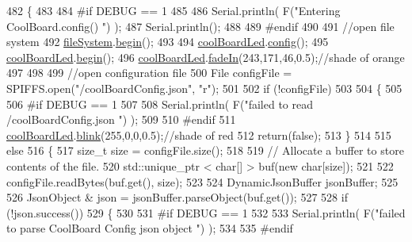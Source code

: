 \begin{DoxyCode}
482 \{
483 
484 \textcolor{preprocessor}{#if DEBUG == 1}
485 
486     Serial.println( F(\textcolor{stringliteral}{"Entering CoolBoard.config() "}) );
487     Serial.println();
488 
489 \textcolor{preprocessor}{#endif}
490 
491     \textcolor{comment}{//open file system}
492     \hyperlink{classCoolBoard_a42c2586fbb13ff7f06538e9284e8538d}{fileSystem}.\hyperlink{classCoolFileSystem_a6ba6f666ed4c530174f8569d2c636748}{begin}();
493 
494     \hyperlink{classCoolBoard_a1b1d3c684a5baa56b08486e192fd8e97}{coolBoardLed}.\hyperlink{classCoolBoardLed_a1b60e5e30bea96c49ed62ed1bf1ffc8b}{config}();
495     \hyperlink{classCoolBoard_a1b1d3c684a5baa56b08486e192fd8e97}{coolBoardLed}.\hyperlink{classCoolBoardLed_ae3cbde8affcc6f011cbd698c8ef911f6}{begin}();
496     \hyperlink{classCoolBoard_a1b1d3c684a5baa56b08486e192fd8e97}{coolBoardLed}.\hyperlink{classCoolBoardLed_ab778f5e7bed0ab74e3906d82110493c3}{fadeIn}(243,171,46,0.5);\textcolor{comment}{//shade of orange     }
497 
498     
499     \textcolor{comment}{//open configuration file}
500     File configFile = SPIFFS.open(\textcolor{stringliteral}{"/coolBoardConfig.json"}, \textcolor{stringliteral}{"r"});
501     
502     \textcolor{keywordflow}{if} (!configFile)
503 
504     \{
505     
506 \textcolor{preprocessor}{    #if DEBUG == 1}
507 
508         Serial.println( F(\textcolor{stringliteral}{"failed to read /coolBoardConfig.json  "}) );
509 
510 \textcolor{preprocessor}{    #endif}
511         \hyperlink{classCoolBoard_a1b1d3c684a5baa56b08486e192fd8e97}{coolBoardLed}.\hyperlink{classCoolBoardLed_a96e1ea13003eee34c9dbcef340404426}{blink}(255,0,0,0.5);\textcolor{comment}{//shade of red     }
512         \textcolor{keywordflow}{return}(\textcolor{keyword}{false});
513     \}
514 
515     \textcolor{keywordflow}{else}
516     \{
517         \textcolor{keywordtype}{size\_t} size = configFile.size();
518 
519         \textcolor{comment}{// Allocate a buffer to store contents of the file.}
520         std::unique\_ptr < char[] > buf(\textcolor{keyword}{new} \textcolor{keywordtype}{char}[size]);
521 
522         configFile.readBytes(buf.get(), size);
523 
524         DynamicJsonBuffer jsonBuffer;
525 
526         JsonObject & json = jsonBuffer.parseObject(buf.get());
527 
528         \textcolor{keywordflow}{if} (!json.success())
529         \{
530         
531 \textcolor{preprocessor}{        #if DEBUG == 1}
532 
533             Serial.println( F(\textcolor{stringliteral}{"failed to parse CoolBoard Config json object "}) );
534     
535 \textcolor{preprocessor}{        #endif}

\end{DoxyCode}
